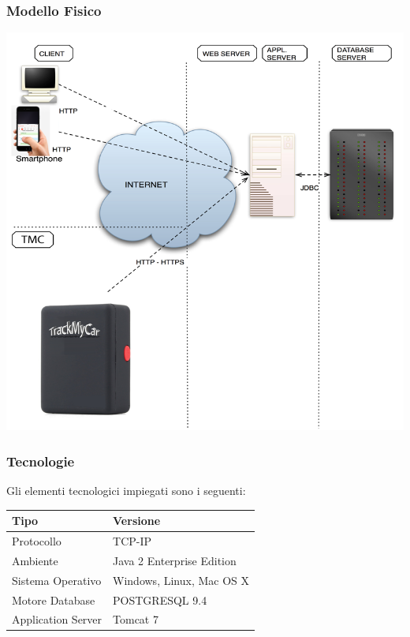 \documentclass[a4paper,12pt]{beamer}
\begin{document}
\begin{frame}
\frametitle{Modello Fisico}
\includegraphics[scale=.3]{../IMG/ModFisico.png}
\end{frame}

\begin{frame}
\frametitle{Tecnologie}
\begin{table}[h]
Gli elementi tecnologici impiegati sono i seguenti:
\begin{center}
\begin{tabular}{ p{}  p{} }
\rowcolor{Ash}
\hline	
Tipo & Versione \\ \hline
Protocollo & TCP-IP \\ 
Ambiente & Java 2 Enterprise Edition \\ 
Sistema Operativo & Windows, Linux, Mac OS X \\ 
Motore Database & POSTGRESQL 9.4 \\ 
Application Server & Tomcat 7 \\ \hline
\end{tabular}
\end{center}
\end{table}
\end{frame}
\end{document}
